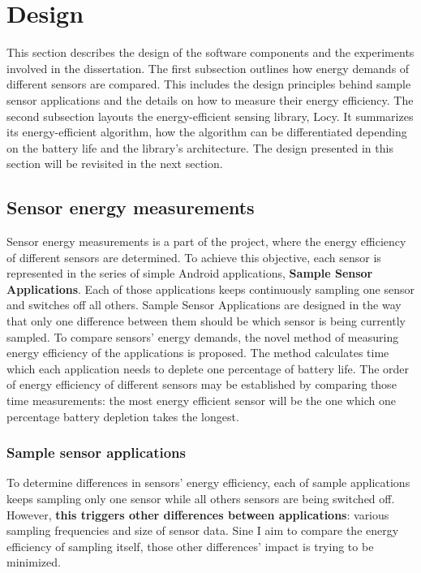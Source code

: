 \section{Design}
\label{s:design}
\hspace{10pt} This section describes the design of the software components and the experiments involved in the dissertation. The first subsection outlines how energy demands of different sensors are compared. This includes the design principles behind sample sensor applications and the details on how to measure their energy efficiency. The second subsection layouts the energy-efficient sensing library, Locy. It summarizes its energy-efficient algorithm, how the algorithm can be differentiated depending on the battery life and the library's architecture. The design presented in this section will be revisited in the next section.

\subsection{Sensor energy measurements}
\label{s:design:measurements}
\hspace{10pt} Sensor energy measurements is a part of the project, where the energy efficiency of different sensors are determined. To achieve this objective, each sensor is represented in the series of simple Android applications, \textbf{Sample Sensor Applications}. Each of those applications keeps continuously sampling one sensor and switches off all others. Sample Sensor Applications are designed in the way that only one difference between them should be which sensor is being currently sampled. To compare sensors' energy demands, the novel method of measuring energy efficiency of the applications is proposed. The method calculates time which each application needs to deplete one percentage of battery life. The order of energy efficiency of different sensors may be established by comparing those time measurements: the most energy efficient sensor will be the one which one percentage battery depletion takes the longest. 

\subsubsection{Sample sensor applications}
\label{s:design:measurements:sampleapps}
\hspace{10pt} To determine differences in sensors' energy efficiency, each of sample applications keeps sampling only one sensor while all others sensors are being switched off.  However, \textbf{this triggers other differences between applications}: various sampling frequencies and size of sensor data. Sine I aim to compare the energy efficiency of sampling itself, those other differences' impact is trying to be minimized. 


